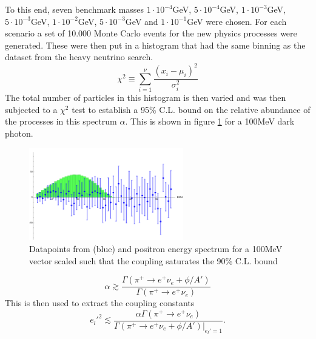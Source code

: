 To this end, seven benchmark masses $1\cdot10^{-4}$GeV, $5\cdot10^{-4}$GeV, $1\cdot10^{-3}$GeV, $5\cdot10^{-3}$GeV, $1\cdot10^{-2}$GeV, $5\cdot10^{-3}$GeV and $1\cdot10^{-1}$GeV were chosen.
For each scenario a set of 10.000 Monte Carlo events for the new physics processes were generated. 
These were then put in a histogram that had the same binning as the dataset from the heavy neutrino search. 
\begin{equation}
\chi^2\equiv \sum^\nu_{i=1}\frac{(x_i-\mu_i)^2}{\sigma_i^2}
\end{equation}
The total number of particles in this histogram is then varied and was then subjected to a $\chi^2$ test to establish a 95\% C.L. bound on the  relative abundance of the processes in this spectrum $\alpha$. This is shown in figure \ref{fg:PionExamplePlots} for a 100MeV dark photon.
\begin{figure}[h]
  \centering
    \includegraphics[width=0.6\textwidth]{imgs/PionExamplePlot}
    \caption{Datapoints from \cite{Aguilar-Arevalo:2017vlf}(blue) and positron energy spectrum for a 100MeV vector scaled such that the coupling saturates the 90\% C.L. bound} 
    \label{fg:PionExamplePlots}
\end{figure}
\begin{equation}
\alpha \gtrsim \frac{\Gamma(\pi^+\rightarrow e^+ \nu_e + \phi/A')}{\Gamma(\pi^+\rightarrow e^+ \nu_e)}
\end{equation}
This is then used to extract the coupling constants 
\begin{equation}
e_l'^2\lesssim \frac{\alpha\Gamma(\pi^+\rightarrow e^+ \nu_e)}{\Gamma(\pi^+\rightarrow e^+ \nu_e + \phi/A')|_{e_l'=1}}.
\end{equation}

